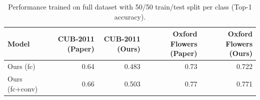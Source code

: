 \documentclass[11pt]{article}
\begin{document}
\begin{table}[t]
\centering
\scriptsize
\caption{Performance trained on full dataset with 50/50 train/test split per class (Top-1 accuracy).}
\label{tab:table4}
\begin{tabular}{lrrrr}
\toprule
Model & CUB-2011 (Paper) & CUB-2011 (Ours) & Oxford Flowers (Paper) & Oxford Flowers (Ours) \\ \midrule
Ours (fc) & 0.64 & 0.483 & 0.73 & 0.722 \\
Ours (fc+conv) & 0.66 & 0.503 & 0.77 & 0.771 \\
 \bottomrule
\end{tabular}
\end{table}
\end{document}
